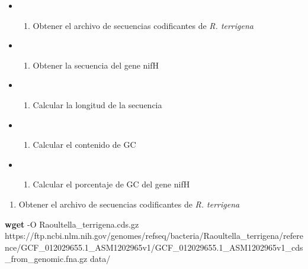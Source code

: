 \documentclass[
]{book}
\newenvironment{Shaded}{\begin{snugshade}}{\end{snugshade}}
\newcommand{\AttributeTok}[1]{\textcolor[rgb]{0.13,0.29,0.53}{#1}}
\newcommand{\FunctionTok}[1]{\textcolor[rgb]{0.13,0.29,0.53}{\textbf{#1}}}
\newcommand{\NormalTok}[1]{#1}
\providecommand{\tightlist}{%
  \setlength{\itemsep}{0pt}\setlength{\parskip}{0pt}}
\begin{document}
\begin{itemize}
\tightlist
\item
  \begin{enumerate}
  \def\labelenumi{\arabic{enumi}.}
  \tightlist
  \item
    Obtener el archivo de secuencias codificantes de \emph{R. terrigena}
  \end{enumerate}
\item
  \begin{enumerate}
  \def\labelenumi{\arabic{enumi}.}
  \setcounter{enumi}{1}
  \tightlist
  \item
    Obtener la secuencia del gene nifH
  \end{enumerate}
\item
  \begin{enumerate}
  \def\labelenumi{\arabic{enumi}.}
  \setcounter{enumi}{2}
  \tightlist
  \item
    Calcular la longitud de la secuencia
  \end{enumerate}
\item
  \begin{enumerate}
  \def\labelenumi{\arabic{enumi}.}
  \setcounter{enumi}{3}
  \tightlist
  \item
    Calcular el contenido de GC
  \end{enumerate}
\item
  \begin{enumerate}
  \def\labelenumi{\arabic{enumi}.}
  \setcounter{enumi}{4}
  \tightlist
  \item
    Calcular el porcentaje de GC del gene nifH
  \end{enumerate}
\end{itemize}

\begin{enumerate}
\def\labelenumi{\arabic{enumi}.}
\tightlist
\item
  Obtener el archivo de secuencias codificantes de \emph{R. terrigena}
\end{enumerate}

\begin{Shaded}
\begin{Highlighting}[]
\FunctionTok{wget} \AttributeTok{{-}O}\NormalTok{ Raoultella\_terrigena.cds.gz https://ftp.ncbi.nlm.nih.gov/genomes/refseq/bacteria/Raoultella\_terrigena/reference/GCF\_012029655.1\_ASM1202965v1/GCF\_012029655.1\_ASM1202965v1\_cds\_from\_genomic.fna.gz data/}
\end{Highlighting}
\end{Shaded}
\end{document}
